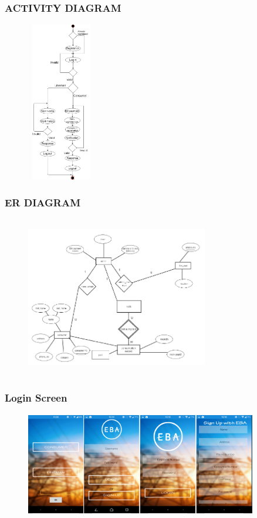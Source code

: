 \documentclass{beamer} %
\theoremstyle{definition} %
\begin{document}
\begin{frame}
\frametitle{ACTIVITY DIAGRAM}
\begin{figure}[center]
\includegraphics[width=3cm,height=7cm]{activity.jpg}
\end{figure}
\end{frame}

\begin{frame}
\frametitle{ER DIAGRAM}
\begin{figure}[center]
\includegraphics[width=8cm,height=7cm]{err.png}
\end{figure}
\end{frame}

\begin{frame}
\frametitle{Login Screen}
\begin{figure}[center]
\includegraphics[width=10.1cm ,height=4.5cm]{Loggin.jpg}
\end{figure}
\end{frame}
\end{document}
